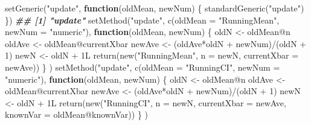 \documentclass[
  12pt,
]{krantz}
\makeatletter
\newenvironment{Shaded}{\begin{snugshade}}{\end{snugshade}}
\newcommand{\AttributeTok}[1]{\textcolor[rgb]{0.61,0.61,0.61}{#1}}
\newcommand{\ControlFlowTok}[1]{\textcolor[rgb]{0.27,0.27,0.27}{\textbf{#1}}}
\newcommand{\DecValTok}[1]{\textcolor[rgb]{0.06,0.06,0.06}{#1}}
\newcommand{\DocumentationTok}[1]{\textcolor[rgb]{0.37,0.37,0.37}{\textbf{\textit{#1}}}}
\newcommand{\FunctionTok}[1]{\textcolor[rgb]{0,0,0}{#1}}
\newcommand{\NormalTok}[1]{#1}
\newcommand{\OtherTok}[1]{\textcolor[rgb]{0.37,0.37,0.37}{#1}}
\newcommand{\SpecialCharTok}[1]{\textcolor[rgb]{0,0,0}{#1}}
\newcommand{\StringTok}[1]{\textcolor[rgb]{0.5,0.5,0.5}{#1}}
\newenvironment{kframe}{%
\medskip{}
\setlength{\fboxsep}{.8em}
 \def\at@end@of@kframe{}%
 \ifinner\ifhmode%
  \def\at@end@of@kframe{\end{minipage}}%
  \begin{minipage}{\columnwidth}%
 \fi\fi%
 \def\FrameCommand##1{\hskip\@totalleftmargin \hskip-\fboxsep
 \colorbox{shadecolor}{##1}\hskip-\fboxsep
     \hskip-\linewidth \hskip-\@totalleftmargin \hskip\columnwidth}%
 \MakeFramed {\advance\hsize-\width
   \@totalleftmargin\z@ \linewidth\hsize
   \@setminipage}}%
 {\par\unskip\endMakeFramed%
 \at@end@of@kframe}
\renewenvironment{Shaded}{\begin{kframe}}{\end{kframe}}
\makeatother
\begin{document}
\begin{Shaded}
\begin{Highlighting}[]
\FunctionTok{setGeneric}\NormalTok{(}\StringTok{"update"}\NormalTok{, }\ControlFlowTok{function}\NormalTok{(oldMean, newNum) \{}
  \FunctionTok{standardGeneric}\NormalTok{(}\StringTok{"update"}\NormalTok{)}
\NormalTok{\})}
\DocumentationTok{\#\# [1] "update"}
\FunctionTok{setMethod}\NormalTok{(}\StringTok{"update"}\NormalTok{,}
          \FunctionTok{c}\NormalTok{(}\AttributeTok{oldMean =} \StringTok{"RunningMean"}\NormalTok{, }\AttributeTok{newNum =} \StringTok{"numeric"}\NormalTok{),}
          \ControlFlowTok{function}\NormalTok{(oldMean, newNum) \{}
\NormalTok{            oldN }\OtherTok{\textless{}{-}}\NormalTok{ oldMean}\SpecialCharTok{@}\NormalTok{n}
\NormalTok{            oldAve }\OtherTok{\textless{}{-}}\NormalTok{ oldMean}\SpecialCharTok{@}\NormalTok{currentXbar}
\NormalTok{            newAve }\OtherTok{\textless{}{-}}\NormalTok{ (oldAve}\SpecialCharTok{*}\NormalTok{oldN }\SpecialCharTok{+}\NormalTok{ newNum)}\SpecialCharTok{/}\NormalTok{(oldN }\SpecialCharTok{+} \DecValTok{1}\NormalTok{)}
\NormalTok{            newN }\OtherTok{\textless{}{-}}\NormalTok{ oldN }\SpecialCharTok{+}\NormalTok{ 1L}
            \FunctionTok{return}\NormalTok{(}\FunctionTok{new}\NormalTok{(}\StringTok{"RunningMean"}\NormalTok{, }\AttributeTok{n =}\NormalTok{ newN, }\AttributeTok{currentXbar =}\NormalTok{ newAve))}
\NormalTok{          \}}
\NormalTok{)}
\FunctionTok{setMethod}\NormalTok{(}\StringTok{"update"}\NormalTok{,}
          \FunctionTok{c}\NormalTok{(}\AttributeTok{oldMean =} \StringTok{"RunningCI"}\NormalTok{, }\AttributeTok{newNum =} \StringTok{"numeric"}\NormalTok{),}
          \ControlFlowTok{function}\NormalTok{(oldMean, newNum) \{}
\NormalTok{            oldN }\OtherTok{\textless{}{-}}\NormalTok{ oldMean}\SpecialCharTok{@}\NormalTok{n}
\NormalTok{            oldAve }\OtherTok{\textless{}{-}}\NormalTok{ oldMean}\SpecialCharTok{@}\NormalTok{currentXbar}
\NormalTok{            newAve }\OtherTok{\textless{}{-}}\NormalTok{ (oldAve}\SpecialCharTok{*}\NormalTok{oldN }\SpecialCharTok{+}\NormalTok{ newNum)}\SpecialCharTok{/}\NormalTok{(oldN }\SpecialCharTok{+} \DecValTok{1}\NormalTok{)}
\NormalTok{            newN }\OtherTok{\textless{}{-}}\NormalTok{ oldN }\SpecialCharTok{+}\NormalTok{ 1L}
            \FunctionTok{return}\NormalTok{(}\FunctionTok{new}\NormalTok{(}\StringTok{"RunningCI"}\NormalTok{, }\AttributeTok{n =}\NormalTok{ newN, }\AttributeTok{currentXbar =}\NormalTok{ newAve, }\AttributeTok{knownVar =}\NormalTok{ oldMean}\SpecialCharTok{@}\NormalTok{knownVar))}
\NormalTok{          \}}
\NormalTok{)}
\end{Highlighting}
\end{Shaded}
\end{document}

